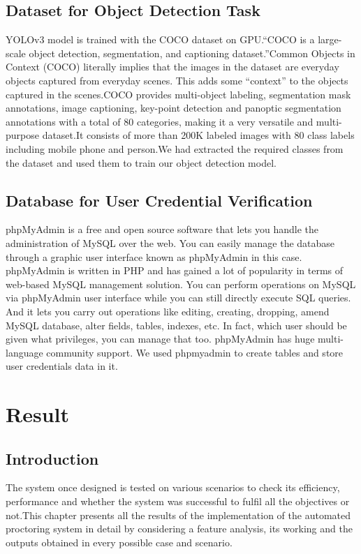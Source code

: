 \documentclass[12pt]{report}
\begin{document}
\subsection{Dataset for Object Detection Task}
YOLOv3 model is trained with the COCO dataset on GPU.“COCO is a large-scale object detection, segmentation, and captioning dataset.”Common Objects in Context (COCO) literally implies that the images in the dataset are everyday objects captured from everyday scenes. This adds some “context” to the objects captured in the scenes.COCO provides multi-object labeling, segmentation mask annotations, image captioning, key-point detection and panoptic segmentation annotations with a total of 80 categories, making it a very versatile and multi-purpose dataset.It consists of more than 200K labeled images with 80 class labels including mobile phone and person.We had extracted the required classes from the dataset and used them to train our object detection model.
\subsection{Database for User Credential Verification}
phpMyAdmin is a free and open source software that lets you handle the administration of MySQL over the web. You can easily manage the database through a graphic user interface known as phpMyAdmin in this case. phpMyAdmin is written in PHP and has gained a lot of popularity in terms of web-based MySQL management solution. You can perform operations on MySQL via phpMyAdmin user interface while you can still directly execute SQL queries. And it lets you carry out operations like editing, creating, dropping, amend MySQL database, alter fields, tables, indexes, etc. In fact, which user should be given what privileges, you can manage that too. phpMyAdmin has huge multi-language community support. We used phpmyadmin to create tables and store user credentials data in it.


\section{Result}
\subsection{Introduction}
The system once designed is tested on various scenarios to check its efficiency, performance and whether the system was successful to fulfil all the objectives or not.This chapter presents all the results of the implementation of the automated proctoring system in detail by considering a feature analysis, its working and the outputs obtained in every possible case and scenario.
\end{document}
